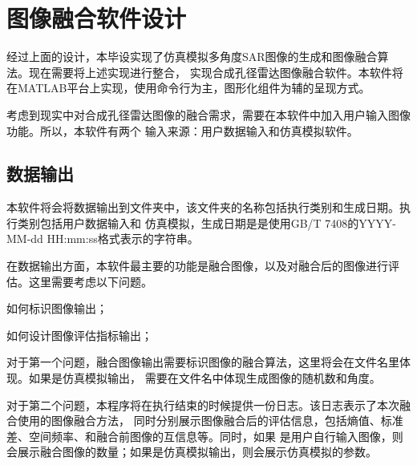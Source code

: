 \documentclass{xduugthesis}
\begin{document}
\section{图像融合软件设计}
经过上面的设计，本毕设实现了仿真模拟多角度SAR图像的生成和图像融合算法。现在需要将上述实现进行整合，
实现合成孔径雷达图像融合软件。本软件将在MATLAB平台上实现，使用命令行为主，图形化组件为辅的呈现方式。\par
考虑到现实中对合成孔径雷达图像的融合需求，需要在本软件中加入用户输入图像功能。所以，本软件有两个
输入来源：用户数据输入和仿真模拟软件。
\subsection{数据输出}
本软件将会将数据输出到文件夹中，该文件夹的名称包括执行类别和生成日期。执行类别包括用户数据输入和
仿真模拟，生成日期是是使用GB/T 7408\cite{ISO_Time}的YYYY-MM-dd HH:mm:ss格式表示的字符串。\par
在数据输出方面，本软件最主要的功能是融合图像，以及对融合后的图像进行评估。这里需要考虑以下问题。
\begin{compactenum}
	\item 如何标识图像输出；
	\item 如何设计图像评估指标输出；
\end{compactenum}\par
对于第一个问题，融合图像输出需要标识图像的融合算法，这里将会在文件名里体现。如果是仿真模拟输出，
需要在文件名中体现生成图像的随机数和角度。\par
对于第二个问题，本程序将在执行结束的时候提供一份日志。该日志表示了本次融合使用的图像融合方法，
同时分别展示图像融合后的评估信息，包括熵值、标准差、空间频率、和融合前图像的互信息等。同时，如果
是用户自行输入图像，则会展示融合图像的数量；如果是仿真模拟输出，则会展示仿真模拟的参数。\par
\end{document}
